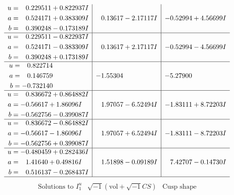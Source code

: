 \documentclass[1p]{elsarticle_modified}
\theoremstyle{definition}
\newcommand{\I}{\sqrt{-1}}
\begin{document}
$$\begin{array}{c|c|c}
\begin{aligned}
u &= \phantom{-}0.229511 + 0.822937 I \\
a &= \phantom{-}0.524171 + 0.383309 I \\
b &= \phantom{-}0.390248 - 0.173189 I\end{aligned}
 & \phantom{-}0.13617 - 2.17117 I & -0.52994 + 4.56699 I \\ \hline\begin{aligned}
u &= \phantom{-}0.229511 - 0.822937 I \\
a &= \phantom{-}0.524171 - 0.383309 I \\
b &= \phantom{-}0.390248 + 0.173189 I\end{aligned}
 & \phantom{-}0.13617 + 2.17117 I & -0.52994 - 4.56699 I \\ \hline\begin{aligned}
u &= \phantom{-}0.822714\phantom{ +0.000000I} \\
a &= \phantom{-}0.146759\phantom{ +0.000000I} \\
b &= -0.732140\phantom{ +0.000000I}\end{aligned}
 & -1.55304\phantom{ +0.000000I} & -5.27900\phantom{ +0.000000I} \\ \hline\begin{aligned}
u &= \phantom{-}0.836672 + 0.864882 I \\
a &= -0.56617 + 1.86096 I \\
b &= -0.562756 - 0.399087 I\end{aligned}
 & \phantom{-}1.97057 - 6.52494 I & -1.83111 + 8.72203 I \\ \hline\begin{aligned}
u &= \phantom{-}0.836672 - 0.864882 I \\
a &= -0.56617 - 1.86096 I \\
b &= -0.562756 + 0.399087 I\end{aligned}
 & \phantom{-}1.97057 + 6.52494 I & -1.83111 - 8.72203 I \\ \hline\begin{aligned}
u &= -0.480459 + 0.282436 I \\
a &= \phantom{-}1.41640 + 0.49816 I \\
b &= \phantom{-}0.516137 - 0.268437 I\end{aligned}
 & \phantom{-}1.51898 - 0.09189 I & \phantom{-}7.42707 - 0.14730 I\\
 \hline 
 \end{array}$$\newpage$$\begin{array}{c|c|c}  
\text{Solutions to }I^u_{1}& \I (\text{vol} + \sqrt{-1}CS) & \text{Cusp shape}\\

\end{array}$$
\end{document}
